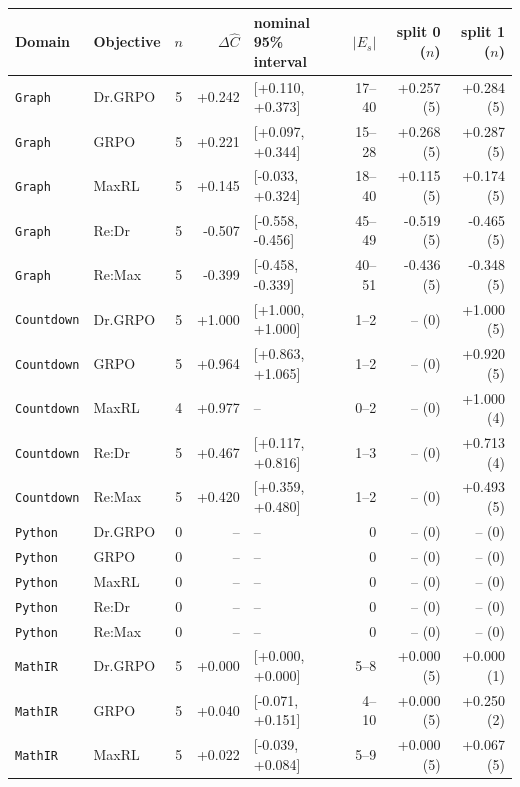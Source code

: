 \begin{table}[!htbp]
\centering
\scriptsize
\setlength{\tabcolsep}{3pt}
\begin{tabular}{@{}llcrlrrr@{}}
\toprule
Domain & Objective & $n$ & $\Delta\widehat C$ & nominal 95\% interval & $|E_s|$ & split 0 ($n$) & split 1 ($n$) \\
\midrule
\texttt{Graph} & Dr.GRPO & 5 & +0.242 & [+0.110, +0.373] & 17--40 & +0.257 (5) & +0.284 (5) \\
\texttt{Graph} & GRPO & 5 & +0.221 & [+0.097, +0.344] & 15--28 & +0.268 (5) & +0.287 (5) \\
\texttt{Graph} & MaxRL & 5 & +0.145 & [-0.033, +0.324] & 18--40 & +0.115 (5) & +0.174 (5) \\
\texttt{Graph} & Re:Dr & 5 & -0.507 & [-0.558, -0.456] & 45--49 & -0.519 (5) & -0.465 (5) \\
\texttt{Graph} & Re:Max & 5 & -0.399 & [-0.458, -0.339] & 40--51 & -0.436 (5) & -0.348 (5) \\
\texttt{Countdown} & Dr.GRPO & 5 & +1.000 & [+1.000, +1.000] & 1--2 & -- (0) & +1.000 (5) \\
\texttt{Countdown} & GRPO & 5 & +0.964 & [+0.863, +1.065] & 1--2 & -- (0) & +0.920 (5) \\
\texttt{Countdown} & MaxRL & 4 & +0.977 & -- & 0--2 & -- (0) & +1.000 (4) \\
\texttt{Countdown} & Re:Dr & 5 & +0.467 & [+0.117, +0.816] & 1--3 & -- (0) & +0.713 (4) \\
\texttt{Countdown} & Re:Max & 5 & +0.420 & [+0.359, +0.480] & 1--2 & -- (0) & +0.493 (5) \\
\texttt{Python} & Dr.GRPO & 0 & -- & -- & 0 & -- (0) & -- (0) \\
\texttt{Python} & GRPO & 0 & -- & -- & 0 & -- (0) & -- (0) \\
\texttt{Python} & MaxRL & 0 & -- & -- & 0 & -- (0) & -- (0) \\
\texttt{Python} & Re:Dr & 0 & -- & -- & 0 & -- (0) & -- (0) \\
\texttt{Python} & Re:Max & 0 & -- & -- & 0 & -- (0) & -- (0) \\
\texttt{MathIR} & Dr.GRPO & 5 & +0.000 & [+0.000, +0.000] & 5--8 & +0.000 (5) & +0.000 (1) \\
\texttt{MathIR} & GRPO & 5 & +0.040 & [-0.071, +0.151] & 4--10 & +0.000 (5) & +0.250 (2) \\
\texttt{MathIR} & MaxRL & 5 & +0.022 & [-0.039, +0.084] & 5--9 & +0.000 (5) & +0.067 (5) \\

\end{tabular}
\end{table}
